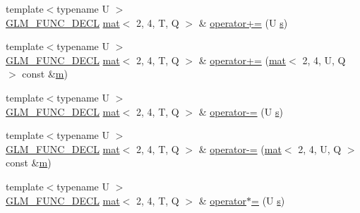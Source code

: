 \begin{DoxyCompactItemize}
\item 
{\footnotesize template$<$typename U $>$ }\\\mbox{\hyperlink{setup_8hpp_ab2d052de21a70539923e9bcbf6e83a51}{G\+L\+M\+\_\+\+F\+U\+N\+C\+\_\+\+D\+E\+CL}} \mbox{\hyperlink{structglm_1_1mat}{mat}}$<$ 2, 4, T, Q $>$ \& \mbox{\hyperlink{structglm_1_1mat_3_012_00_014_00_01_t_00_01_q_01_4_a9db5a3048b0256fb313cdd6a41da96a1}{operator+=}} (U \mbox{\hyperlink{_s_d_l__opengl_8h_a4af680a6c683f88ed67b76f207f2e6e4}{s}})
\item 
{\footnotesize template$<$typename U $>$ }\\\mbox{\hyperlink{setup_8hpp_ab2d052de21a70539923e9bcbf6e83a51}{G\+L\+M\+\_\+\+F\+U\+N\+C\+\_\+\+D\+E\+CL}} \mbox{\hyperlink{structglm_1_1mat}{mat}}$<$ 2, 4, T, Q $>$ \& \mbox{\hyperlink{structglm_1_1mat_3_012_00_014_00_01_t_00_01_q_01_4_aa1d0289966cfba6918cdbdab0eb6d894}{operator+=}} (\mbox{\hyperlink{structglm_1_1mat}{mat}}$<$ 2, 4, U, Q $>$ const \&\mbox{\hyperlink{_s_d_l__opengl__glext_8h_af593500c283bf1a787a6f947f503a5c2}{m}})
\item 
{\footnotesize template$<$typename U $>$ }\\\mbox{\hyperlink{setup_8hpp_ab2d052de21a70539923e9bcbf6e83a51}{G\+L\+M\+\_\+\+F\+U\+N\+C\+\_\+\+D\+E\+CL}} \mbox{\hyperlink{structglm_1_1mat}{mat}}$<$ 2, 4, T, Q $>$ \& \mbox{\hyperlink{structglm_1_1mat_3_012_00_014_00_01_t_00_01_q_01_4_ac74de81b921e4090b67c3717d9144308}{operator-\/=}} (U \mbox{\hyperlink{_s_d_l__opengl_8h_a4af680a6c683f88ed67b76f207f2e6e4}{s}})
\item 
{\footnotesize template$<$typename U $>$ }\\\mbox{\hyperlink{setup_8hpp_ab2d052de21a70539923e9bcbf6e83a51}{G\+L\+M\+\_\+\+F\+U\+N\+C\+\_\+\+D\+E\+CL}} \mbox{\hyperlink{structglm_1_1mat}{mat}}$<$ 2, 4, T, Q $>$ \& \mbox{\hyperlink{structglm_1_1mat_3_012_00_014_00_01_t_00_01_q_01_4_a8000ab27bcdbf1041cdaaad2c71df7a3}{operator-\/=}} (\mbox{\hyperlink{structglm_1_1mat}{mat}}$<$ 2, 4, U, Q $>$ const \&\mbox{\hyperlink{_s_d_l__opengl__glext_8h_af593500c283bf1a787a6f947f503a5c2}{m}})
\item 
{\footnotesize template$<$typename U $>$ }\\\mbox{\hyperlink{setup_8hpp_ab2d052de21a70539923e9bcbf6e83a51}{G\+L\+M\+\_\+\+F\+U\+N\+C\+\_\+\+D\+E\+CL}} \mbox{\hyperlink{structglm_1_1mat}{mat}}$<$ 2, 4, T, Q $>$ \& \mbox{\hyperlink{structglm_1_1mat_3_012_00_014_00_01_t_00_01_q_01_4_a1cdf73b8ff43f07225b25bce3d2e62ba}{operator$\ast$=}} (U \mbox{\hyperlink{_s_d_l__opengl_8h_a4af680a6c683f88ed67b76f207f2e6e4}{s}})

\end{DoxyCompactItemize}
